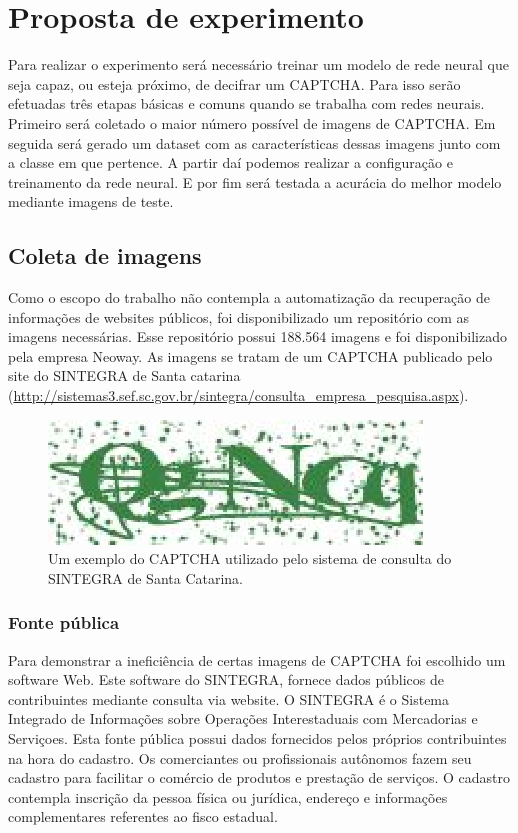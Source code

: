 \chapter{Proposta de experimento}

Para realizar o experimento será necessário treinar um modelo de rede
neural que seja capaz, ou esteja próximo, de decifrar um CAPTCHA. Para
isso serão efetuadas três etapas básicas e comuns quando se trabalha
com redes neurais. Primeiro será coletado o maior número possível de
imagens de CAPTCHA. Em seguida será gerado um dataset com as
características dessas imagens junto com a classe em que pertence. A
partir daí podemos realizar a configuração e treinamento da rede
neural. E por fim será testada a acurácia do melhor modelo mediante
imagens de teste.

\section{Coleta de imagens}

Como o escopo do trabalho não contempla a automatização da recuperação
de informações de websites públicos, foi disponibilizado um
repositório com as imagens necessárias. Esse repositório possui
188.564 imagens e foi disponibilizado pela empresa Neoway. As imagens
se tratam de um CAPTCHA publicado pelo site do SINTEGRA de Santa
catarina
(\url{http://sistemas3.sef.sc.gov.br/sintegra/consulta_empresa_pesquisa.aspx}).

\begin{figure}[H]
\centering
\includegraphics[scale=1]{imagens/exemplo_captcha}
\caption{Um exemplo do CAPTCHA utilizado pelo sistema de consulta do
  SINTEGRA de Santa Catarina.}
\label{fig:exemplo_captcha}
\end{figure}


\subsection{Fonte pública}

Para demonstrar a ineficiência de certas imagens de CAPTCHA foi
escolhido um software Web. Este software do SINTEGRA, fornece dados
públicos de contribuintes mediante consulta via website. O SINTEGRA é
o Sistema Integrado de Informações sobre Operações Interestaduais com
Mercadorias e Serviçoes. Esta fonte pública possui dados fornecidos
pelos próprios contribuintes na hora do cadastro. Os comerciantes ou
profissionais autônomos fazem seu cadastro para facilitar o comércio
de produtos e prestação de serviços. O cadastro contempla inscrição da
pessoa física ou jurídica, endereço e informações complementares
referentes ao fisco estadual.


